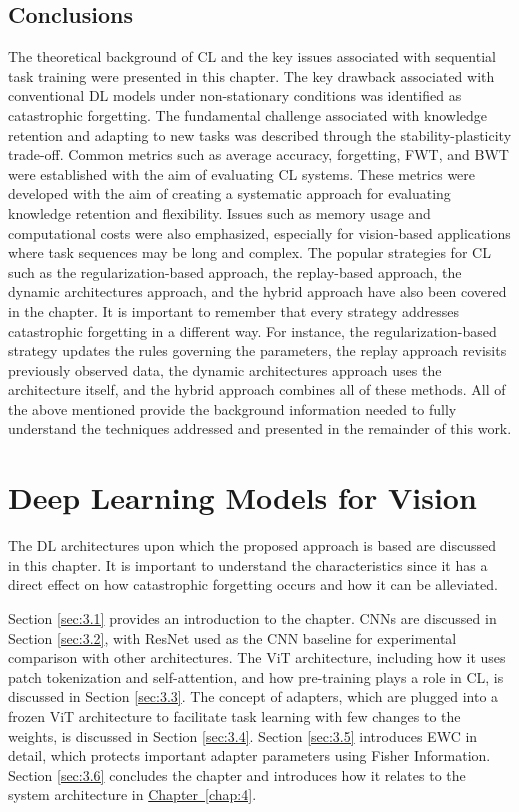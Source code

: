 \documentclass[english, LaM, oneside]{sapthesis}%
\numberwithin{equation}{chapter}
\begin{document}
\section{Conclusions}
The theoretical background of CL and the key issues associated with sequential task training were presented in this chapter. The key drawback associated with conventional DL models under non-stationary conditions was identified as catastrophic forgetting. The fundamental challenge associated with knowledge retention and adapting to new tasks was described through the stability-plasticity trade-off.
Common metrics such as average accuracy, forgetting, FWT, and BWT were established with the aim of evaluating CL systems. These metrics were developed with the aim of creating a systematic approach for evaluating knowledge retention and flexibility. Issues such as memory usage and computational costs were also emphasized, especially for vision-based applications where task sequences may be long and complex.
The popular strategies for CL such as the regularization-based approach, the replay-based approach, the dynamic architectures approach, and the hybrid approach have also been covered in the chapter. It is important to remember that every strategy addresses catastrophic forgetting in a different way. For instance, the regularization-based strategy updates the rules governing the parameters, the replay approach revisits previously observed data, the dynamic architectures approach uses the architecture itself, and the hybrid approach combines all of these methods.
All of the above mentioned provide the background information needed to fully understand the techniques addressed and presented in the remainder of this work.

\chapter{Deep Learning Models for Vision}
\label{chap:3}
The DL architectures upon which the proposed approach is based are discussed in this chapter. It is important to understand the characteristics since it has a direct effect on how catastrophic forgetting occurs and how it can be alleviated.

Section \ref{sec:3.1} provides an introduction to the chapter. CNNs are discussed in Section \ref{sec:3.2}, with ResNet used as the CNN baseline for experimental comparison with other architectures. The ViT architecture, including how it uses patch tokenization and self-attention, and how pre-training plays a role in CL, is discussed in Section \ref{sec:3.3}. The concept of adapters, which are plugged into a frozen ViT architecture to facilitate task learning with few changes to the weights, is discussed in Section \ref{sec:3.4}. Section \ref{sec:3.5} introduces EWC in detail, which protects important adapter parameters using Fisher Information. Section \ref{sec:3.6} concludes the chapter and introduces how it relates to the system architecture in \hyperref[chap:4]{Chapter~\ref*{chap:4}}.
\end{document}
